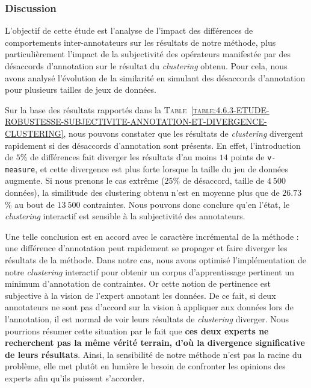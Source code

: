 		\subsubsection{Discussion}
		
			L'objectif de cette étude est l'analyse de l'impact des différences de comportements inter-annotateurs sur les résultats de notre méthode, plus particulièrement l'impact de la subjectivité des opérateurs manifestée par des désaccords d'annotation sur le résultat du \textit{clustering} obtenu.
			Pour cela, nous avons analysé l'évolution de la similarité en simulant des désaccords d'annotation pour plusieurs tailles de jeux de données.
			
			Sur la base des résultats rapportés dans la \textsc{Table~\ref{table:4.6.3-ETUDE-ROBUSTESSE-SUBJECTIVITE-ANNOTATION-ET-DIVERGENCE-CLUSTERING}}, nous pouvons constater que les résultats de \textit{clustering} divergent rapidement si des désaccords d'annotation sont présents.
			En effet, l'introduction de $5$\% de différences fait diverger les résultats d'au moins $14$ points de \texttt{v-measure}, et cette divergence est plus forte lorsque la taille du jeu de données augmente.
			Si nous prenons le cas extrême ($25$\% de désaccord, taille de $4~500$ données), la similitude des clustering obtenu n'est en moyenne plus que de $26.73$\% au bout de $13~500$ contraintes.
			Nous pouvons donc conclure qu'en l'état, le \textit{clustering} interactif est sensible à la subjectivité des annotateurs.
			
			Une telle conclusion est en accord avec le caractère incrémental de la méthode : une différence d'annotation peut rapidement se propager et faire diverger les résultats de la méthode.
			Dans notre cas, nous avons optimisé l'implémentation de notre \textit{clustering} interactif pour obtenir un corpus d'apprentissage pertinent un minimum d'annotation de contraintes.
			Or cette notion de pertinence est subjective à la vision de l'expert annotant les données.
			De ce fait, si deux annotateurs ne sont pas d'accord sur la vision à appliquer aux données lors de l'annotation, il est normal de voir leurs résultats de \textit{clustering} diverger.
			Nous pourrions résumer cette situation par le fait que \textbf{ces deux experts ne recherchent pas la même vérité terrain, d'où la divergence significative de leurs résultats}.
			Ainsi, la sensibilité de notre méthode n'est pas la racine du problème, elle met plutôt en lumière le besoin de confronter les opinions des experts afin qu'ils puissent s'accorder.
			
